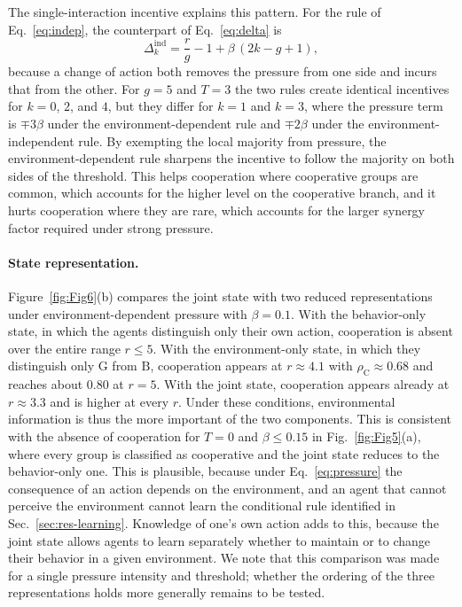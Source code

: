 \documentclass[%
  aip,cha,
  amsmath,amssymb,
  reprint,
  article-title,
]{revtex4-2}
\begin{document}
The single-interaction incentive explains this pattern. For the rule of Eq.~\eqref{eq:indep}, the counterpart of Eq.~\eqref{eq:delta} is
\begin{equation}
\Delta_k^{\mathrm{ind}}=\frac{r}{g}-1+\beta\,(2k-g+1),
\label{eq:delta-indep}
\end{equation}
because a change of action both removes the pressure from one side and incurs that from the other. For $g=5$ and $T=3$ the two rules create identical incentives for $k=0$, $2$, and $4$, but they differ for $k=1$ and $k=3$, where the pressure term is $\mp3\beta$ under the environment-dependent rule and $\mp2\beta$ under the environment-independent rule. By exempting the local majority from pressure, the environment-dependent rule sharpens the incentive to follow the majority on both sides of the threshold. This helps cooperation where cooperative groups are common, which accounts for the higher level on the cooperative branch, and it hurts cooperation where they are rare, which accounts for the larger synergy factor required under strong pressure.

\paragraph*{State representation.}
Figure~\ref{fig:Fig6}(b) compares the joint state with two reduced representations under environment-dependent pressure with $\beta=0.1$. With the behavior-only state, in which the agents distinguish only their own action, cooperation is absent over the entire range $r\leq5$. With the environment-only state, in which they distinguish only $\mathrm{G}$ from $\mathrm{B}$, cooperation appears at $r\approx4.1$ with $\rho_{\mathrm{C}}\approx0.68$ and reaches about $0.80$ at $r=5$. With the joint state, cooperation appears already at $r\approx3.3$ and is higher at every $r$. Under these conditions, environmental information is thus the more important of the two components. This is consistent with the absence of cooperation for $T=0$ and $\beta\leq0.15$ in Fig.~\ref{fig:Fig5}(a), where every group is classified as cooperative and the joint state reduces to the behavior-only one. This is plausible, because under Eq.~\eqref{eq:pressure} the consequence of an action depends on the environment, and an agent that cannot perceive the environment cannot learn the conditional rule identified in Sec.~\ref{sec:res-learning}. Knowledge of one's own action adds to this, because the joint state allows agents to learn separately whether to maintain or to change their behavior in a given environment. We note that this comparison was made for a single pressure intensity and threshold; whether the ordering of the three representations holds more generally remains to be tested.
\end{document}
